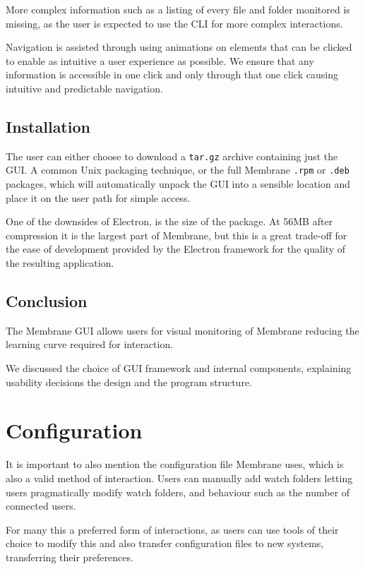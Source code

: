 \documentclass[11pt, a4paper, twoside]{report}
\def\code#1{\texttt{#1}}
\begin{document}
More complex information such as a listing of every file and folder monitored is missing, as the user is expected to use the CLI for more complex interactions.

Navigation is assisted through using animations on elements that can be clicked to enable as intuitive a user experience as possible. We ensure that any information is accessible in one click and only through that one click causing intuitive and predictable navigation.

\subsection{Installation}

The user can either choose to download a \code{tar.gz} archive containing just the GUI. A common Unix packaging technique, or the full Membrane \code{.rpm} or \code{.deb} packages, which will automatically unpack the GUI into a sensible location and place it on the user path for simple access.

One of the downsides of Electron, is the size of the package. At 56MB after compression it is the largest part of Membrane, but this is a great trade-off for the ease of development provided by the Electron framework for the quality of the resulting application.

\subsection{Conclusion}

The Membrane GUI allows users for visual monitoring of Membrane reducing the learning curve required for interaction.

We discussed the choice of GUI framework and internal components, explaining usability decisions the design and the program structure.

\section{Configuration}

It is important to also mention the configuration file Membrane uses, which is also a valid method of interaction. Users can manually add watch folders letting users pragmatically modify watch folders, and behaviour such as the number of connected users.

For many this a preferred form of interactions, as users can use tools of their choice to modify this and also transfer configuration files to new systems, transferring their preferences.
\end{document}
